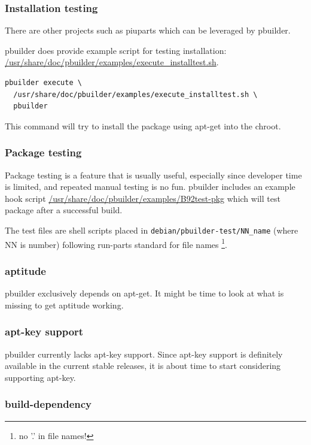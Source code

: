 \documentclass[a4paper]{article}
\begin{document}
\subsubsection{Installation testing}

There are other projects such as piuparts which can be leveraged by
pbuilder.  

pbuilder does provide example script for testing installation:
\url{/usr/share/doc/pbuilder/examples/execute_installtest.sh}.

\begin{verbatim}
pbuilder execute \
  /usr/share/doc/pbuilder/examples/execute_installtest.sh \
  pbuilder
\end{verbatim}

This command will try to install the package using apt-get into the
chroot.

\subsubsection{Package testing}

Package testing is a feature that is usually useful, especially since
developer time is limited, and repeated manual testing is no fun.
pbuilder includes an example hook script
\url{/usr/share/doc/pbuilder/examples/B92test-pkg} which will test
package after a successful build.

The test files are shell scripts placed in
\verb!debian/pbuilder-test/NN_name! (where NN is number) following
run-parts standard for file names \footnote{no '.' in file names!}.

\subsubsection{aptitude}

pbuilder exclusively depends on apt-get.  It might be time to look at
what is missing to get aptitude working.

\subsubsection{apt-key support}

pbuilder currently lacks apt-key support.  Since apt-key support is
definitely available in the current stable releases, it is about time to
start considering supporting apt-key.

\subsubsection{build-dependency}
\end{document}
